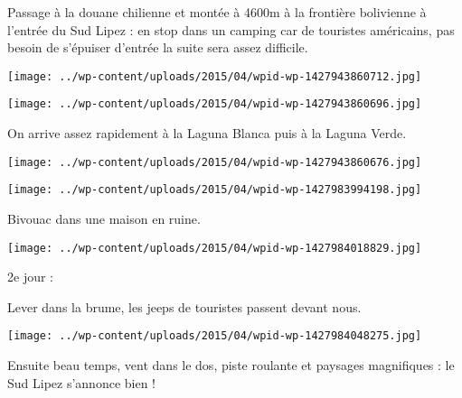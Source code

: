  Passage à la douane chilienne et montée à 4600m à la frontière bolivienne à l'entrée du Sud Lipez : en stop dans un camping car de touristes américains, pas besoin de s'épuiser d'entrée la suite sera assez difficile.

 

\begin{center} \texttt{[image: ../wp-content/uploads/2015/04/wpid-wp-1427943860712.jpg]} \end{center}



 

\begin{center} \texttt{[image: ../wp-content/uploads/2015/04/wpid-wp-1427943860696.jpg]} \end{center}



 On arrive assez rapidement à la Laguna Blanca puis à la Laguna Verde.

 

\begin{center} \texttt{[image: ../wp-content/uploads/2015/04/wpid-wp-1427943860676.jpg]} \end{center}



 

\begin{center} \texttt{[image: ../wp-content/uploads/2015/04/wpid-wp-1427983994198.jpg]} \end{center}



 Bivouac dans une maison en ruine.

 

\begin{center} \texttt{[image: ../wp-content/uploads/2015/04/wpid-wp-1427984018829.jpg]} \end{center}



 2e jour : 

 Lever dans la brume, les jeeps de touristes passent devant nous.

 

\begin{center} \texttt{[image: ../wp-content/uploads/2015/04/wpid-wp-1427984048275.jpg]} \end{center}



 Ensuite beau temps, vent dans le dos, piste roulante et paysages magnifiques : le Sud Lipez s'annonce bien !


